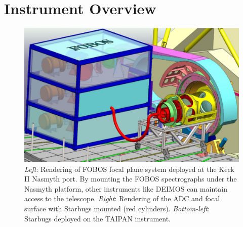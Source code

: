 

\section{Instrument Overview}
\label{sec:concept}


\begin{figure}[h!]
\vskip -0.1in
\includegraphics[width=\textwidth]{figs/FOBOS_inst_v2.pdf}
\caption{\small {} {\it
Left}: Rendering of FOBOS focal plane system deployed at the Keck II
Nasmyth port. By mounting the FOBOS spectrographs under the Nasmyth
platform, other instruments like DEIMOS can maintain access to the
telescope. {\it Right}: Rendering of the ADC and focal surface with
Starbugs mounted (red cylinders). {\it Bottom-left}: Starbugs
deployed on the TAIPAN instrument.}
\label{fig:focalplane}
\end{figure}

